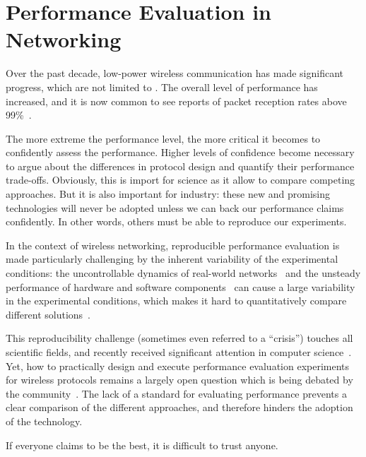 \section{Performance Evaluation in Networking}

Over the past decade, low-power wireless communication has made significant progress, which are not limited to \ST.
The overall level of performance has increased, and it is now common to see reports of packet reception rates above 99\%~\cite{ferrari2011Glossy, duquennoy2015Orchestra, duquennoy2017FiveNines, istomin2018Interferenceresilient}.

The more extreme the performance level, the more critical it becomes to confidently assess the performance.
Higher levels of confidence become necessary to argue about the differences in protocol design and quantify their performance trade-offs.
Obviously, this is import for science as it allow to compare competing approaches.
But it is also important for industry: these new and promising technologies will never be adopted unless we can back our performance claims confidently.
In other words, others must be able to reproduce our experiments.

In the context of wireless networking, reproducible performance evaluation is made particularly challenging by the inherent variability of the experimental conditions: the uncontrollable dynamics of real-world networks~\cite{matos18reproducible, burchfield09rfjungle} and the unsteady performance of hardware and software components~\cite{maricq2018Taming, blackburn2016Truth} can cause a large variability in the experimental conditions, which makes it hard to quantitatively compare different solutions~\cite{bajpai18dagstuhl_report}.

This reproducibility challenge (sometimes even referred to a ``crisis''\cite{baker16reproducibility}) touches all scientific fields, and recently received significant attention in computer science~\cite{collberg15reproducibility, saucez2018Thoughts, bajpai19dagstuhl_guide}.
Yet, how to practically design and execute performance evaluation experiments for wireless protocols remains a largely open question which is being debated by the community~\cite{boano2018IoTBench}.
The lack of a standard for evaluating performance prevents a clear comparison of the different approaches, and therefore hinders the adoption of the technology.

If everyone claims to be the best, it is difficult to trust anyone.

